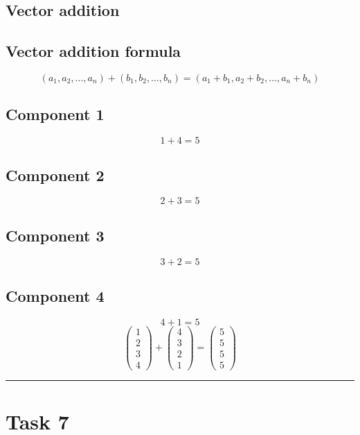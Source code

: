 \documentclass{article}
\begin{document}
\subsection*{Vector addition}
\subsection*{ \vspace{1em} Vector addition formula}
\[
(a_1, a_2, \dots, a_n) + (b_1, b_2, \dots, b_n) = (a_1 + b_1, a_2 + b_2, \dots, a_n + b_n)
\]
\subsection*{ \vspace{1em} Component 1}
\[
1 + 4 = 5
\]
\subsection*{ \vspace{1em} Component 2}
\[
2 + 3 = 5
\]
\subsection*{ \vspace{1em} Component 3}
\[
3 + 2 = 5
\]
\subsection*{ \vspace{1em} Component 4}
\[
4 + 1 = 5
\]
\[
\begin{pmatrix}1 \\ 2 \\ 3 \\ 4\end{pmatrix} + \begin{pmatrix}4 \\ 3 \\ 2 \\ 1\end{pmatrix} = \begin{pmatrix}5 \\ 5 \\ 5 \\ 5\end{pmatrix}
\]
\vspace{1em}
\hrule
\vspace{1em}
\section*{Task 7}
\end{document}
